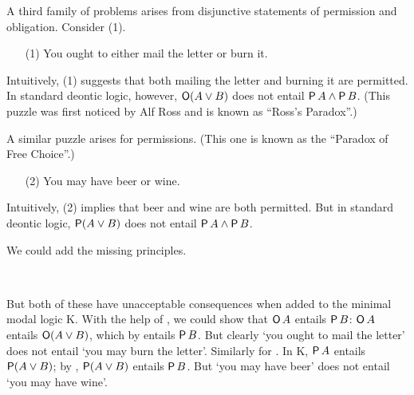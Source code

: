 

A third family of problems arises from disjunctive statements of permission and
obligation. Consider (1).
\begin{itemize}[leftmargin=10mm]
\itemsep-1mm
\item[(1)] You ought to either mail the letter or burn it.
\end{itemize}
Intuitively, (1) suggests that both mailing the letter and burning it are
permitted. In standard deontic logic, however, $\operatorname{\mathsf{O}}(A \lor B)$ does not entail
$\operatorname{\mathsf{P}} A \land \operatorname{\mathsf{P}} B$. (This puzzle was first noticed by Alf Ross and is known as
``Ross's Paradox''.)

A similar puzzle arises for permissions. (This one is known as the ``Paradox of
Free Choice''.)
\begin{itemize}[leftmargin=10mm]
\itemsep-1mm
\item[(2)] You may have beer or wine.
\end{itemize}
Intuitively, (2) implies that beer and wine are both permitted. But in standard
deontic logic, $\operatorname{\mathsf{P}}(A \lor B)$ does not entail $\operatorname{\mathsf{P}} A \land \operatorname{\mathsf{P}} B$.

We could add the missing principles.
%
\begin{principles}
  \\
\end{principles}
%
But both of these have unacceptable consequences when added to the minimal modal
logic K. With the help of , we could show that $\operatorname{\mathsf{O}} A$ entails $\operatorname{\mathsf{P}} B$:
$\operatorname{\mathsf{O}} A$ entails $\operatorname{\mathsf{O}} (A \lor B)$, which by  entails $\operatorname{\mathsf{P}} B$. But clearly
`you ought to mail the letter' does not entail `you may burn the letter'.
Similarly for . In K, $\operatorname{\mathsf{P}} A$ entails $\operatorname{\mathsf{P}}(A \lor B)$; by ,
$\operatorname{\mathsf{P}}(A \lor B)$ entails $\operatorname{\mathsf{P}} B$. But `you may have beer' does not entail `you
may have wine'.


